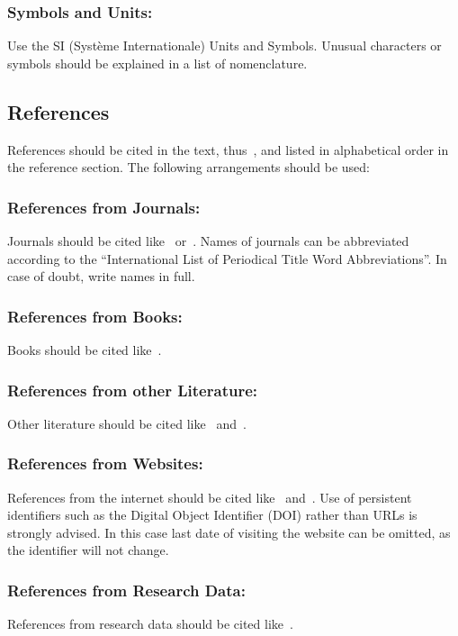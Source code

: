 \documentclass{isprs} %
\begin{document}
\subsubsection{Symbols and Units:}\label{sec:Symbols and Units}
Use the SI (Syst\`{e}me Internationale) Units and Symbols. Unusual characters 
or symbols should be explained in a list of nomenclature.

\subsection{References}\label{sec:References}
References should be cited in the text, thus~\cite{smith1987rep}, and listed in alphabetical order in the reference section. The following arrangements should be used:

\subsubsection{References from Journals:} 
Journals should be cited like~\cite{smith1987} or~\cite{michalis2008}. Names of journals can be abbreviated according to the ``International List of Periodical Title Word Abbreviations''. In case of doubt, write names in full.

\subsubsection{References from Books:} 
Books should be cited like~\cite{foerstner2016}.

\subsubsection{References from other Literature:}
Other literature should be cited like~\cite{smith1987rep} and~\cite{smith2000}.

\subsubsection{References from Websites:}
References from the internet should be cited like~\cite{chan2017} and~\cite{maas2017}. Use of persistent identifiers such as the Digital Object Identifier (DOI) rather than URLs is strongly advised. In this case last date of visiting the website can be omitted, as the identifier will not change.

\subsubsection{References from Research Data:}
References from research data should be cited like~\cite{dubayah2013}.
\end{document}
